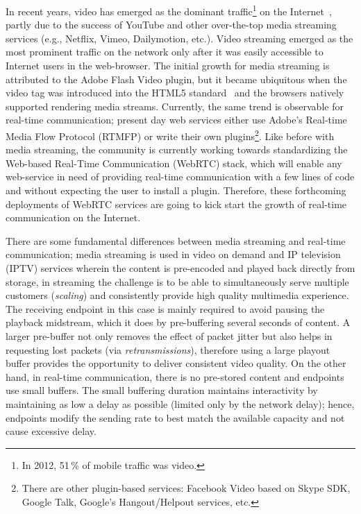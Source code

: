 In recent years, video has emerged as the dominant traffic\footnote{In 2012,
51\,\% of mobile traffic was video.} on the Internet~\cite{cvni.13,dawn.zb},
partly due to the success of YouTube and other over-the-top media streaming
services (e.g., Netflix, Vimeo, Dailymotion, etc.). Video streaming emerged as
the most prominent traffic on the network only after it was easily accessible
to Internet users in the web-browser. The initial growth for media streaming
is attributed to the Adobe Flash Video plugin, but it became ubiquitous when
the video tag was introduced into the HTML5 standard~\cite{html5-spec} and the
browsers natively supported rendering media streams. Currently, the same trend
is observable for real-time communication; present day web services either use
Adobe's Real-time Media Flow Protocol (RTMFP) \cite{draft.rtmfp} or write
their own plugins\footnote{There are other  plugin-based services: Facebook
Video based on Skype SDK, Google Talk, Google's Hangout/Helpout services,
etc.}. Like before with media streaming, the community is currently working
towards standardizing the Web-based Real-Time Communication (WebRTC) stack,
which will enable any web-service in need of providing real-time communication
with a few lines of code and without expecting the user to install a plugin.
Therefore, these forthcoming deployments of WebRTC services are going to kick
start the growth of real-time communication on the Internet.


There are some fundamental differences between media streaming and real-time
communication; media streaming is used in video on demand and IP television
(IPTV) services wherein the content is pre-encoded and played back directly
from storage, in streaming the challenge is to be able to simultaneously serve
multiple customers (\emph{scaling}) and consistently provide high quality
multimedia experience. The receiving endpoint in this case is mainly required
to avoid pausing the playback midstream, which it does by pre-buffering
several seconds of content. A larger pre-buffer not only removes the effect of
packet jitter but also helps in requesting lost packets (via
\emph{retransmissions}), therefore using a large playout buffer provides the
opportunity to deliver consistent video quality.
On the other hand, in real-time communication, there is no pre-stored content
and endpoints use small buffers. The small buffering duration maintains
interactivity by maintaining as low a delay as possible (limited only by the
network delay); hence, endpoints modify the sending rate to best match the
available capacity and not cause excessive delay.

